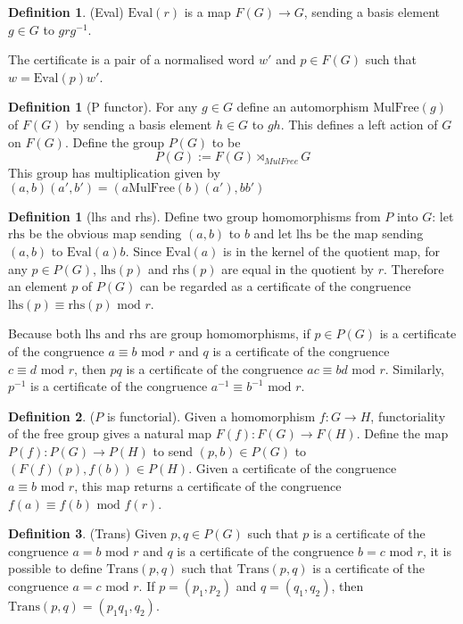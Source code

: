 \documentclass[11pt]{article} %
\theoremstyle{definition}
\theoremstyle{definition}
\theoremstyle{definition}
\theoremstyle{definition}
\theoremstyle{definition}
\newtheorem{defn}[theorem]{Definition}
\theoremstyle{definition}
\newtheorem{subdef}{Definition}[theorem]
\begin{document}
\begin{defn}(Eval)
  $\text{Eval}(r)$ is a map $F(G) \to G$, sending a basis element $g \in G$ to $grg^{-1}$.
\end{defn}

The certificate is a pair of a normalised word $w'$ and
$p \in F(G)$ such that $w = \text{Eval}(p) w'$.

\begin{defn}[P functor]
  For any $g \in G$ define an automorphism $\text{MulFree}(g)$ of $F(G)$ by sending a basis
  element $h \in G$ to $gh$. This defines a left action of $G$ on $F(G)$.
  Define the group $P(G)$ to be
  \begin{equation}
  P(G) := F(G) \rtimes_{MulFree} G
  \end{equation}
  This group has multiplication given by $(a, b) (a', b') = (a \text{MulFree}(b)(a'), bb')$
\end{defn}

\begin{subdef}[lhs and rhs]
Define two group homomorphisms from $P$ into $G$: let
$\text{rhs}$ be the obvious map sending $(a, b)$ to $b$ and let
$\text{lhs}$ be the map sending $(a,b)$ to $\text{Eval}(a)b$.
Since $\text{Eval}(a)$ is in the kernel of the quotient map,
for any $p\in P(G)$, $\text{lhs}(p)$ and $\text{rhs}(p)$ are equal in the quotient by $r$.
Therefore an element $p$ of $P(G)$ can be regarded as a certificate of the congruence
$\text{lhs}(p) \equiv \text{rhs}(p) \text{ mod } r$.
\end{subdef}

Because both $\text{lhs}$ and $\text{rhs}$ are group homomorphisms, if $p \in P(G)$ is a certificate
of the congruence $a \equiv b \text{ mod } r$ and $q$ is a certificate of the congruence
$c \equiv d \text{ mod } r$, then $pq$ is a certificate of the congruence $ac \equiv bd \text{ mod } r$.
Similarly, $p^{-1}$ is a certificate of the congruence $a^{-1} \equiv b^{-1} \text{ mod } r$.

\begin{subdef}($P$ is functorial).
  Given a homomorphism $f: G \to H$,
  functoriality of the free group gives a natural map $F(f): F(G) \to F(H)$.
  Define the map $P(f): P(G) \to P(H)$ to send $(p, b) \in P(G)$ to $(F(f)(p), f(b)) \in P(H)$.
  Given a certificate of the congruence $a \equiv b \text{ mod } r$, this map returns
  a certificate of the congruence $f(a) \equiv f(b) \text{ mod } f(r)$.
\end{subdef}

\begin{subdef}(Trans)
  Given $p,q \in P(G)$ such that $p$ is a certificate of the congruence $a = b \text{ mod } r$
  and $q$ is a certificate of the congruence $b = c \text{ mod } r$, it is possible to define
  $\text{Trans}(p,q)$ such that $\text{Trans}(p,q)$ is a certificate of the congruence $a = c \text{ mod } r$.
  If $p = (p_1, p_2)$ and $q = (q_1, q_2)$, then $\text{Trans}(p,q) = (p_1q_1, q_2)$.
\end{subdef}
\end{document}
